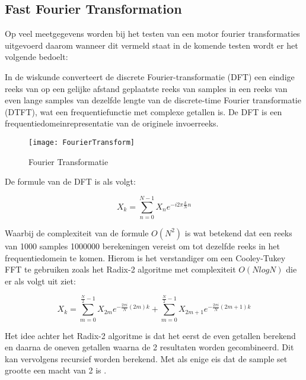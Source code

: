\subsection{Fast Fourier Transformation}

Op veel meetgegevens worden bij het testen van een motor fourier transformaties uitgevoerd daarom wanneer dit vermeld staat in de komende testen wordt er het volgende bedoelt:

\vspace{0.5cm}

In de wiskunde converteert de discrete Fourier-transformatie (\gls{DFT}) een eindige reeks van op een gelijke afstand geplaatste reeks van samples in een reeks van even lange samples van dezelfde lengte van de discrete-time Fourier transformatie (\gls{DTFT}), wat een frequentiefunctie met complexe getallen is. De \gls{DFT} is een frequentiedomeinrepresentatie van de originele invoerreeks.


\begin{figure}[H]
	\centering
	\texttt{[image: FourierTransform]}
	\label{fig:FourierTransformatie}
	\caption{Fourier Transformatie \cite{web:FFT}}
\end{figure}

De formule van de \gls{DFT} is als volgt:

\begin{equation}
	X_k = \sum_{n=0}^{N-1}X_n e^{-i2\pi\frac{k}{N}n}
\end{equation}

Waarbij de complexiteit van de formule $O\left(N^2\right)$ is wat betekend dat een reeks van 1000 samples 1000000 berekeningen vereist om tot dezelfde reeks in het frequentiedomein te komen. Hierom is het verstandiger om een Cooley-Tukey FFT te gebruiken zoals het Radix-2 algoritme met complexiteit $O\left(Nlog{N}\right)$ die er als volgt uit ziet:

\begin{equation}
	X_k = {\sum_{m=0}^{\frac{N}{2}-1}X_{2m}e^{-\frac{2\pi i}{N}(2m)k}} + {\sum_{m=0}^{\frac{N}{2}-1}X_{2m+1}e^{-\frac{2\pi i}{N}(2m+1)k}}
\end{equation}

Het idee achter het Radix-2 algoritme is dat het eerst de even getallen berekend en daarna de oneven getallen waarna de 2 resultaten worden gecombineerd. Dit kan vervolgens recursief worden berekend. Met als enige eis dat de sample set grootte een macht van 2 is \cite{web:Radix-2FFT}.

\newpage

